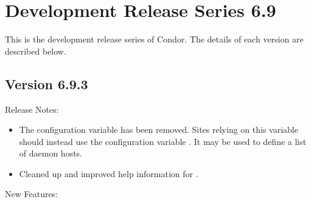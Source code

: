 
\section{\label{sec:History-6-9}Development Release Series 6.9}

This is the development release series of Condor.
The details of each version are described below.

\subsection*{\label{sec:New-6-9-3}Version 6.9.3}

\noindent Release Notes:

\begin{itemize}

\item The  configuration variable has
  been removed.
  Sites relying on this variable should instead use the configuration
  variable . It may be used to
  define a list of  daemon hosts.

\item Cleaned up and improved help information for .

\end{itemize}


\noindent New Features:

